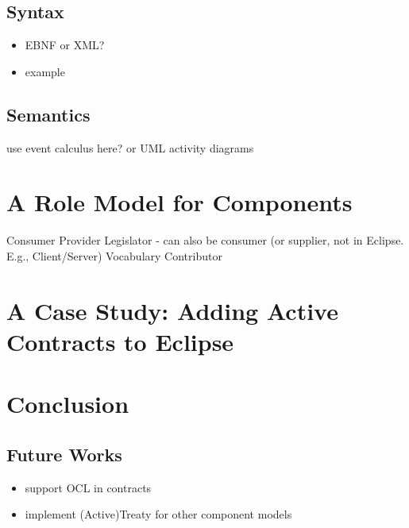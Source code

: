 \documentclass{llncs}
\begin{document}
\subsection{Syntax}

\begin{itemize}
\item EBNF or XML?
\item example
\end{itemize}


\subsection{Semantics}

use event calculus here? or UML activity diagrams



\section{A Role Model for Components}

Consumer
Provider
Legislator - can also be consumer (or supplier, not in Eclipse. E.g., Client/Server)
Vocabulary Contributor



\section{A Case Study: Adding Active Contracts to Eclipse}



\section{Conclusion}


\subsection{Future Works}

\begin{itemize}
	\item support OCL in contracts
	\item implement (Active)Treaty for other component models
\end{itemize}



  
    
\end{document}
